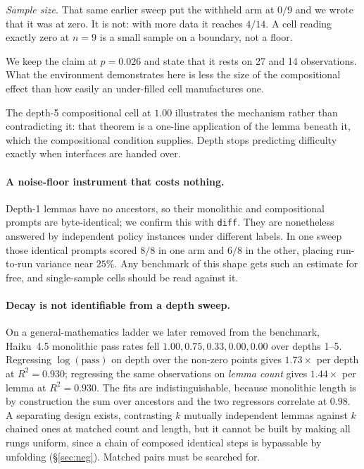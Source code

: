 \documentclass[10pt]{article}
\begin{document}
\emph{Sample size.} That same earlier sweep put the withheld arm at $0/9$ and we
wrote that it was at zero. It is not: with more data it reaches $4/14$. A cell
reading exactly zero at $n=9$ is a small sample on a boundary, not a floor.

We keep the claim at $p=0.026$ and state that it rests on 27 and 14
observations. What the environment demonstrates here is less the size of the
compositional effect than how easily an under-filled cell manufactures one.

The depth-5 compositional cell at $1.00$ illustrates the mechanism rather than
contradicting it: that theorem is a one-line application of the lemma beneath
it, which the compositional condition supplies. Depth stops predicting
difficulty exactly when interfaces are handed over.

\paragraph{A noise-floor instrument that costs nothing.}
Depth-1 lemmas have no ancestors, so their monolithic and compositional prompts
are byte-identical; we confirm this with \texttt{diff}. They are nonetheless
answered by independent policy instances under different labels. In one sweep
those identical prompts scored $8/8$ in one arm and $6/8$ in the other, placing
run-to-run variance near $25\%$. Any benchmark of this shape gets such an
estimate for free, and single-sample cells should be read against it.

\paragraph{Decay is not identifiable from a depth sweep.}
On a general-mathematics ladder we later removed from the benchmark, Haiku~4.5
monolithic pass rates fell $1.00, 0.75, 0.33, 0.00, 0.00$ over depths 1--5. Regressing
$\log(\text{pass})$ on depth over the non-zero points gives $1.73\times$ per
depth at $R^2=0.930$; regressing the same observations on \emph{lemma count}
gives $1.44\times$ per lemma at $R^2=0.930$. The fits are indistinguishable,
because monolithic length is by construction the sum over ancestors and the two
regressors correlate at $0.98$. A separating design exists, contrasting $k$
mutually independent lemmas against $k$ chained ones at matched count and
length, but it cannot be built by making all rungs uniform, since a chain of
composed identical steps is bypassable by unfolding (\S\ref{sec:neg}). Matched
pairs must be searched for.
\end{document}
